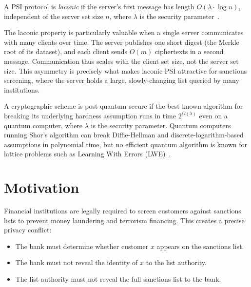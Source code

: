 \begin{definition}\label{def:laconic}
A PSI protocol is \textit{laconic} if the server's first message has length
$O(\lambda \cdot \log n)$, independent of the server set size $n$, where $\lambda$
is the security parameter~\cite{dottling2023efficient}.
\end{definition}

\begin{remark}
The laconic property is particularly valuable when a single server communicates with
many clients over time. The server publishes one short digest (the Merkle root of
its dataset), and each client sends $O(m)$ ciphertexts in a second message.
Communication thus scales with the client set size, not the server set size. This
asymmetry is precisely what makes laconic PSI attractive for sanctions screening,
where the server holds a large, slowly-changing list queried by many institutions.
\end{remark}

\begin{definition}\label{def:pq}
A cryptographic scheme is post-quantum secure if the best known algorithm for
breaking its underlying hardness assumption runs in time $2^{\Omega(\lambda)}$ even
on a quantum computer, where $\lambda$ is the security parameter. Quantum computers
running Shor's algorithm can break Diffie-Hellman and discrete-logarithm-based
assumptions in polynomial time, but no efficient quantum algorithm is known for
lattice problems such as Learning With Errors (LWE)~\cite{regev2005lattices}.
\end{definition}

\section{Motivation}

Financial institutions are legally required to screen customers against sanctions
lists to prevent money laundering and terrorism financing. This creates a precise
privacy conflict:
\begin{itemize}
    \item The bank must determine whether customer $x$ appears on the sanctions list.
    \item The bank must not reveal the identity of $x$ to the list authority.
    \item The list authority must not reveal the full sanctions list to the bank.
\end{itemize}

